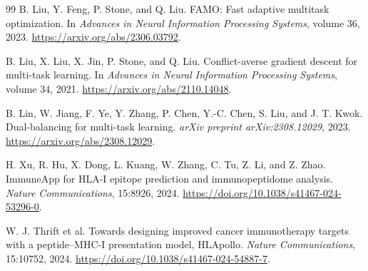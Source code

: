 \begin{thebibliography}{99}
B. Liu, Y. Feng, P. Stone, and Q. Liu.
\newblock FAMO: Fast adaptive multitask optimization.
\newblock In \emph{Advances in Neural Information Processing Systems}, volume 36, 2023.
\newblock \url{https://arxiv.org/abs/2306.03792}.

B. Liu, X. Liu, X. Jin, P. Stone, and Q. Liu.
\newblock Conflict-averse gradient descent for multi-task learning.
\newblock In \emph{Advances in Neural Information Processing Systems}, volume 34, 2021.
\newblock \url{https://arxiv.org/abs/2110.14048}.

B. Lin, W. Jiang, F. Ye, Y. Zhang, P. Chen, Y.-C. Chen, S. Liu, and J. T. Kwok.
\newblock Dual-balancing for multi-task learning.
\newblock \emph{arXiv preprint arXiv:2308.12029}, 2023.
\newblock \url{https://arxiv.org/abs/2308.12029}.

H. Xu, R. Hu, X. Dong, L. Kuang, W. Zhang, C. Tu, Z. Li, and Z. Zhao.
\newblock ImmuneApp for HLA-I epitope prediction and immunopeptidome analysis.
\newblock \emph{Nature Communications}, 15:8926, 2024.
\newblock \url{https://doi.org/10.1038/s41467-024-53296-0}.

W. J. Thrift et al.
\newblock Towards designing improved cancer immunotherapy targets with a peptide--MHC-I presentation model, HLApollo.
\newblock \emph{Nature Communications}, 15:10752, 2024.
\newblock \url{https://doi.org/10.1038/s41467-024-54887-7}.

\end{thebibliography}
\endgroup
